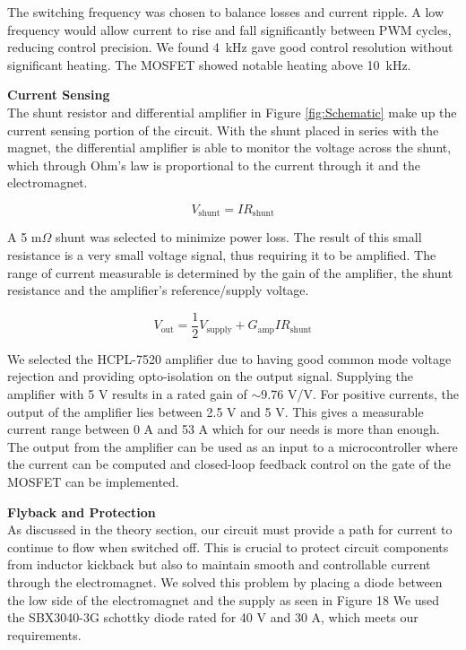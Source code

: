 \documentclass[11pt]{article} %
\begin{document}
The switching frequency was chosen to balance losses and current ripple. A low frequency would allow current to rise and fall significantly between PWM cycles, reducing control precision. We found 4~kHz gave good control resolution without significant heating. The MOSFET showed notable heating above 10~kHz.


\textbf{Current Sensing}\\
The shunt resistor and differential amplifier in Figure \ref{fig:Schematic} make up the current sensing portion of the circuit. With the shunt placed in series with the magnet, the differential amplifier is able to monitor the voltage across the shunt, which through Ohm’s law is proportional to the current through it and the electromagnet.

\begin{equation}
    V_{\text{shunt}} = IR_{\text{shunt}}
    \label{eqn:shunt_voltage_eq}
\end{equation}

A 5 m$\Omega$ shunt was selected to minimize power loss. The result of this small resistance is a very small voltage signal, thus requiring it to be amplified. The range of current measurable is determined by the gain of the amplifier, the shunt resistance and the amplifier’s reference/supply voltage.

\begin{equation}
    V_{\text{out}} = \frac{1}{2}V_{\text{supply}}+G_{\text{amp}}IR_{\text{shunt}}
    \label{eqn:shunt_voltage_eq_w_gain}
\end{equation}

We selected the HCPL-7520 amplifier due to having good common mode voltage rejection and providing opto-isolation on the output signal. Supplying the amplifier with 5 V results in a rated gain of $\sim$9.76 V/V. For positive currents, the output of the amplifier lies between 2.5 V and 5 V. This gives a measurable current range between 0 A and 53 A which for our needs is more than enough. The output from the amplifier can be used as an input to a microcontroller where the current can be computed and closed-loop feedback control on the gate of the MOSFET can be implemented.

\textbf{Flyback and Protection}\\
As discussed in the theory section, our circuit must provide a path for current to continue to flow when switched off. This is crucial to protect circuit components from inductor kickback but also to maintain smooth and controllable current through the electromagnet. We solved this problem by placing a diode between the low side of the electromagnet and the supply as seen in Figure 18 We used the SBX3040-3G schottky diode rated for 40 V and 30 A, which meets our requirements.
\end{document}
